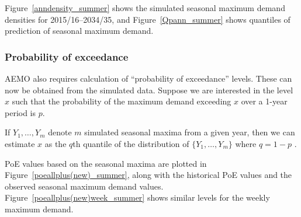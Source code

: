 \documentclass[11pt]{article}
\begin{document}

Figure~\ref{anndensity_summer} shows the simulated seasonal maximum demand densities for 2015/16--2034/35, and Figure~\ref{Qpann_summer} shows quantiles of prediction of seasonal maximum demand.






\subsubsection{Probability of exceedance}\label{sec:poe}

AEMO also requires calculation of ``probability of exceedance'' levels. These can now be obtained from the simulated data. Suppose we are interested in the level $x$ such that the probability of the maximum demand exceeding $x$ over a 1-year period is $p$. 

If $Y_1,\dots,Y_m$ denote $m$ simulated seasonal maxima from a given year, then we can estimate $x$ as the $q$th quantile of the distribution of $\{Y_1,\dots,Y_m\}$ where $q=1-p$ \citep{HF96}. 

PoE values based on the seasonal maxima are plotted in Figure~\ref{poeallplus(new)_summer}, along with the historical PoE values and the observed seasonal maximum demand values. Figure~\ref{poeallplus(new)week_summer} shows similar levels for the weekly maximum demand.



\end{document}
